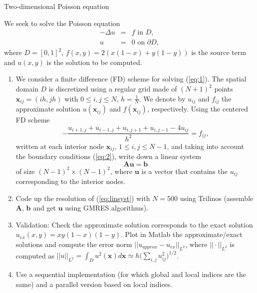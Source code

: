 \documentclass[a4paper, 10pt]{article}
\newcommand{\bx}{\mathbf{x}}
\newcommand{\bu}{\mathbf{u}}
\newcommand{\bA}{\mathbf{A}}
\newcommand{\bb}{\mathbf{b}}
\begin{document}

\begin{center}
\Large Two-dimensional Poisson equation
\end{center}

\vspace{1cm}

We seek to solve the Poisson equation
\begin{eqnarray}
-\Delta u &=& f \mbox{ in } D,\label{eq:1}\\[1ex]
%
u &=& 0 \mbox{ on } \partial D,\label{eq:2}
\end{eqnarray}
where $D=[0,1]^2$, $f(x,y)=2(x(1-x)+y(1-y))$ is the source term and $u(x,y)$ is the solution to be computed.

\begin{enumerate}

\item We consider a finite difference (FD) scheme for solving (\ref{eq:1}). The spatial domain $D$ is discretized using a
regular grid made of $(N+1)^2$ points $\bx_{ij}=(ih,jh)$ with $0\leq i,j \leq N$, $h=\frac{1}{N}$. We denote by $u_{ij}$
and $f_{ij}$ the approximate solution $u(\bx_{ij})$ and $f(\bx_{ij})$, respectively.
Using the centered FD scheme
$$
-\frac{u_{i+1,j}+u_{i-1,j}+u_{i,j+1}+u_{i,j-1}-4 u_{ij}}{h^2}=f_{ij},
$$
written at each interior node $\bx_{ij}$, $1 \leq i,j \leq N-1$, and taking into account the boundary conditions
(\ref{eq:2}), write down a linear system 
\begin{equation}\label{eq:linsyst}
\bA \bu = \bb
\end{equation}
of size $(N-1)^2\times (N-1)^2$, where $\bu$ is a vector that contains the $u_{ij}$ corresponding to the interior nodes.

\item Code up the resolution of (\ref{eq:linsyst}) with $N=500$ using Trilinos 
(assemble $\bA$, $\bb$ and get $\bu$ using GMRES algorithms).

\item Validation: Check the approximate solution corresponds to the exact solution $u_{ex}(x,y)=xy(1-x)(1-y)$. 
Plot in Matlab the approximate/exact solutions and compute the error norm $||u_{approx}-u_{ex}||_{L^2}$, where $||\cdot||_{L^2}$
is computed as $||u||_{L^2}=\int_{D} u^2(\bx)d\bx \simeq h \bigl(\sum_{i,j}u^2_{ij}\bigr)^{1/2}$.

\item Use a sequential implementation (for which global and local indices are the same) and a parallel version based on local indices.

\end{enumerate}



\end{document}
